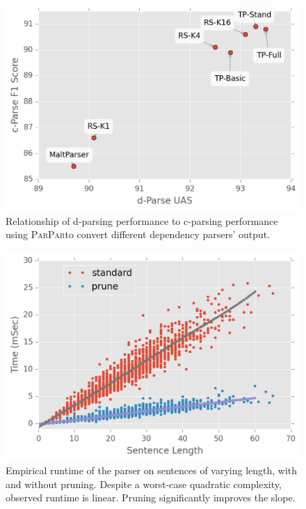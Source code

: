 \documentclass[11pt,letterpaper]{article}
\newcommand{\ParseName}{\textsc{ParPar}}
\begin{document}
\begin{figure}
  \includegraphics[scale=0.5]{../notebooks/parsers}
\caption{\label{fig:corr} Relationship of d-parsing performance to
  c-parsing performance using \ParseName to convert different
  dependency parsers' output.}
\end{figure}


\begin{figure}
  \centering
  \includegraphics[scale=0.5]{../notebooks/comp}
  \caption{Empirical runtime of the parser on sentences of varying length, with and without pruning. 
  Despite a worst-case quadratic complexity, observed runtime is
  linear. Pruning significantly improves the slope.
\label{fig:speed}}
\end{figure}
\end{document}
